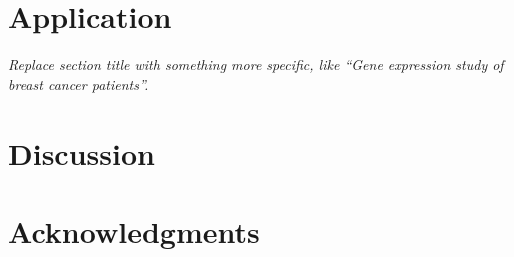 \begin{table}
\centering
\caption{Type 1 error for Student and Welch $t$-tests. Ratio ($n_1:n_2$) displays the sample size of the low-variance and high-variance groups (low-variance first). Student's test suffers from inflated Type I error when the small-variance group is larger.}
\label{tab:error-rate}

\end{table}

\section{Application}
\label{sec:application}

\emph{Replace section title with something more specific, like ``Gene expression study of breast cancer patients''.}

\section{Discussion}
\label{sec:discussion}

\section*{Acknowledgments}

